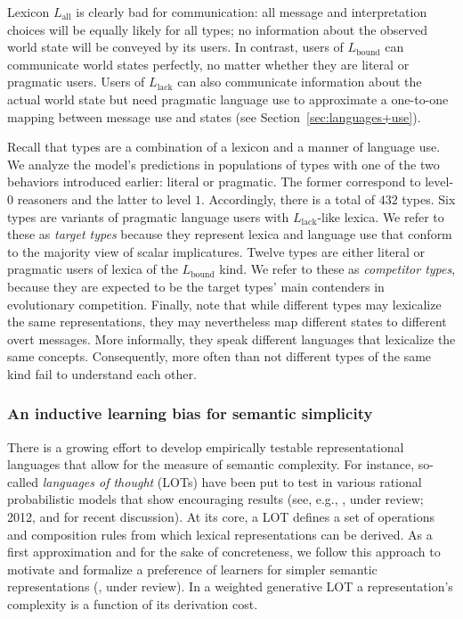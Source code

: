 \documentclass[a4paper, 11pt]{article}
\theoremstyle{Satz}
\newcommand{\mylang}[1]{\ensuremath{L_{\text{#1}}}\xspace} %
\newcommand{\Lall}{\mylang{all}}
\newcommand{\Lbound}{\mylang{bound}}
\newcommand{\Llack}{\mylang{lack}}
\begin{document}
Lexicon $\Lall$ is clearly bad for communication: all message and interpretation choices will
be equally likely for all types; no information about the observed world state will be conveyed
by its users. In contrast, users of $\Lbound$ can communicate world states perfectly, no matter
whether they are literal or pragmatic users. Users of $\Llack$ can also communicate information
about the actual world state but need pragmatic language use to approximate a one-to-one
mapping between message use and states (see Section~\ref{sec:languages+use}).  

Recall that types are a combination of a lexicon and a manner of language use. We analyze the
model's predictions in populations of types with one of the two behaviors introduced earlier:
literal or pragmatic. The former correspond to level-$0$ reasoners and the latter to level $1$. Accordingly, there is a total of $432$ types. Six types are variants of pragmatic language
users with $\Llack$-like lexica. We refer to these as \emph{target types} because they
represent lexica and language use that conform to the majority view of scalar
implicatures. Twelve types are either literal or pragmatic users of lexica of the
$\Lbound$ kind. We refer to these as \emph{competitor types}, because they are expected to be
the target types' main contenders in evolutionary competition. Finally, note that while
different types may lexicalize the same representations, they may nevertheless map different
states to different overt messages. More informally, they speak different languages that
lexicalize the same concepts. Consequently, more often than not different types of the same
kind fail to understand each other.




\subsubsection{An inductive learning bias for semantic simplicity}
\label{sec:an-induct-learn}

There is a growing effort to develop empirically testable representational languages that allow
for the measure of semantic complexity. For instance, so-called {\em languages of thought}
(LOTs) have been put to test in various rational probabilistic models that show encouraging
results (see, e.g., \citealt{katz+etal:2008}, \citeauthor{piantadosi+etal:underreview} under review; 2012, and \citealt{piantadosi+jacobs:2016} for recent discussion). At its
core, a LOT defines a set of operations and composition rules from which lexical representations can be
derived. As a first approximation and for the sake of concreteness, we follow this approach to
motivate and formalize a preference of learners for simpler semantic representations
(\citealt{feldman:2000, chater+vitanyi:2003, piantadosi+etal:2012a,kirby+etal:2015}, \citeauthor{piantadosi+etal:underreview} under review). 
In a weighted generative LOT a representation's complexity is a function of its derivation cost.
\end{document}
